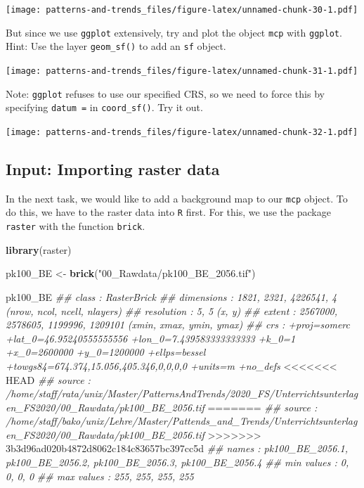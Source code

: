 \documentclass[]{book}
\newenvironment{Shaded}{\begin{snugshade}}{\end{snugshade}}
\newcommand{\CommentTok}[1]{\textcolor[rgb]{0.56,0.35,0.01}{\textit{#1}}}
\newcommand{\KeywordTok}[1]{\textcolor[rgb]{0.13,0.29,0.53}{\textbf{#1}}}
\newcommand{\NormalTok}[1]{#1}
\newcommand{\StringTok}[1]{\textcolor[rgb]{0.31,0.60,0.02}{#1}}
\begin{document}
\texttt{[image: patterns-and-trends\_files/figure-latex/unnamed-chunk-30-1.pdf]}

But since we use \texttt{ggplot} extensively, try and plot the object \texttt{mcp} with \texttt{ggplot}. Hint: Use the layer \texttt{geom\_sf()} to add an \texttt{sf} object.

\texttt{[image: patterns-and-trends\_files/figure-latex/unnamed-chunk-31-1.pdf]}

Note: \texttt{ggplot} refuses to use our specified CRS, so we need to force this by specifying \texttt{datum\ =} in \texttt{coord\_sf()}. Try it out.

\texttt{[image: patterns-and-trends\_files/figure-latex/unnamed-chunk-32-1.pdf]}

\hypertarget{input-importing-raster-data}{%
\subsection{Input: Importing raster data}\label{input-importing-raster-data}}

In the next task, we would like to add a background map to our \texttt{mcp} object. To do this, we have to the raster data into \texttt{R} first. For this, we use the package \texttt{raster} with the function \texttt{brick}.

\begin{Shaded}
\begin{Highlighting}[]

\KeywordTok{library}\NormalTok{(raster)}

\NormalTok{pk100_BE <-}\StringTok{ }\KeywordTok{brick}\NormalTok{(}\StringTok{"00_Rawdata/pk100_BE_2056.tif"}\NormalTok{)}

\NormalTok{pk100_BE}
\CommentTok{## class      : RasterBrick }
\CommentTok{## dimensions : 1821, 2321, 4226541, 4  (nrow, ncol, ncell, nlayers)}
\CommentTok{## resolution : 5, 5  (x, y)}
\CommentTok{## extent     : 2567000, 2578605, 1199996, 1209101  (xmin, xmax, ymin, ymax)}
\CommentTok{## crs        : +proj=somerc +lat_0=46.95240555555556 +lon_0=7.439583333333333 +k_0=1 +x_0=2600000 +y_0=1200000 +ellps=bessel +towgs84=674.374,15.056,405.346,0,0,0,0 +units=m +no_defs }
<<<<<<< HEAD
\CommentTok{## source     : /home/staff/rata/unix/Master/PatternsAndTrends/2020_FS/Unterrichtsunterlagen_FS2020/00_Rawdata/pk100_BE_2056.tif }
=======
\CommentTok{## source     : /home/staff/bako/unix/Lehre/Master/Pattends_and_Trends/Unterrichtsunterlagen_FS2020/00_Rawdata/pk100_BE_2056.tif }
>>>>>>> 3b3d96ad020b4872d8062c184c83657bc397cc5d
\CommentTok{## names      : pk100_BE_2056.1, pk100_BE_2056.2, pk100_BE_2056.3, pk100_BE_2056.4 }
\CommentTok{## min values :               0,               0,               0,               0 }
\CommentTok{## max values :             255,             255,             255,             255}
\end{Highlighting}
\end{Shaded}
\end{document}
